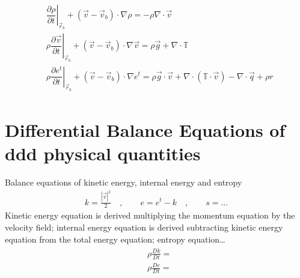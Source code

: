 \documentclass[letterpaper,10pt,english]{jupyterBook}
\begin{document}
\begin{equation*}
\begin{split}\begin{aligned}
 &      \left.\dfrac{\partial \rho   }{\partial t}\right|_{\vec{r}_b} + \left( \vec{v} - \vec{v}_b \right) \cdot \nabla \rho    = - \rho \nabla \cdot \vec{v} \\
 & \rho \left.\dfrac{\partial \vec{v}}{\partial t}\right|_{\vec{r}_b} + \left( \vec{v} - \vec{v}_b \right) \cdot \nabla \vec{v} = \rho \vec{g} + \nabla \cdot \mathbb{T} \\
 & \rho \left.\dfrac{\partial e^t    }{\partial t}\right|_{\vec{r}_b} + \left( \vec{v} - \vec{v}_b \right) \cdot \nabla e^t     = \rho \vec{g} \cdot \vec{v} + \nabla \cdot \left( \mathbb{T} \cdot \vec{v} \right) - \nabla \cdot \vec{q} + \rho r
\end{aligned}\end{split}
\end{equation*}


\sphinxstepscope


\section{Differential Balance Equations of ddd physical quantities}
\label{\detokenize{ch/continuum/balance-derived-differential:differential-balance-equations-of-ddd-physical-quantities}}\label{\detokenize{ch/continuum/balance-derived-differential:continuum-governing-equations-primary-integral}}\label{\detokenize{ch/continuum/balance-derived-differential::doc}}
\sphinxAtStartPar
Balance equations of kinetic energy, internal energy and entropy
\begin{equation*}
\begin{split}k = \frac{|\vec{v}|^2}{2} \quad , \qquad e = e^t - k \quad , \qquad s = \dots\end{split}
\end{equation*}
\sphinxAtStartPar
{} Kinetic energy equation is derived multiplying the momentum equation by the velocity field; internal energy equation is derived subtracting kinetic energy equation from the total energy equation; entropy equation…
\begin{equation*}
\begin{split}\begin{aligned}
 & \rho \frac{D k}{D t} = \\
 & \rho \frac{D e}{D t} = \\
\end{aligned}\end{split}
\end{equation*}
\end{document}
